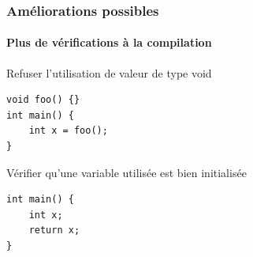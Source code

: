 \documentclass{beamer}
\begin{document}
\begin{frame}[fragile]
    \frametitle{Améliorations possibles}
    \framesubtitle{Plus de vérifications à la compilation}

    \begin{block}{Refuser l'utilisation de valeur de type void}
        \begin{lstlisting}
void foo() {}
int main() {
    int x = foo();
}
        \end{lstlisting}
    \end{block}
    \pause
    \begin{block}{Vérifier qu'une variable utilisée est bien initialisée}
        \begin{lstlisting}
int main() {
    int x;
    return x;
}
        \end{lstlisting}
        
    \end{block}
\end{frame}
\end{document}
